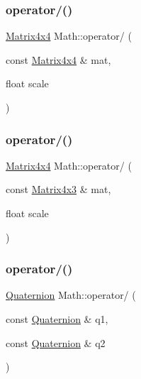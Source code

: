 \mbox{\label{namespace_math_a283dc37f79d3f2d51bb3e494f02a0ad3}} 
\subsubsection{\texorpdfstring{operator/()}{operator/()}\hspace{0.1cm}{\footnotesize\ttfamily [4/7]}}
{\footnotesize\ttfamily \mbox{\hyperlink{struct_math_1_1_matrix4x4}{Matrix4x4}} Math\+::operator/ (\begin{DoxyParamCaption}\item[{const \mbox{\hyperlink{struct_math_1_1_matrix4x4}{Matrix4x4}} \&}]{mat,  }\item[{float}]{scale }\end{DoxyParamCaption})}

\mbox{\label{namespace_math_a015e4eb983da8ccc218796edddd145ff}} 
\subsubsection{\texorpdfstring{operator/()}{operator/()}\hspace{0.1cm}{\footnotesize\ttfamily [5/7]}}
{\footnotesize\ttfamily \mbox{\hyperlink{struct_math_1_1_matrix4x4}{Matrix4x4}} Math\+::operator/ (\begin{DoxyParamCaption}\item[{const \mbox{\hyperlink{struct_math_1_1_matrix4x3}{Matrix4x3}} \&}]{mat,  }\item[{float}]{scale }\end{DoxyParamCaption})}

\mbox{\label{namespace_math_aad9dc0788e7f4ff5da49955014221905}} 
\subsubsection{\texorpdfstring{operator/()}{operator/()}\hspace{0.1cm}{\footnotesize\ttfamily [6/7]}}
{\footnotesize\ttfamily \mbox{\hyperlink{struct_math_1_1_quaternion}{Quaternion}} Math\+::operator/ (\begin{DoxyParamCaption}\item[{const \mbox{\hyperlink{struct_math_1_1_quaternion}{Quaternion}} \&}]{q1,  }\item[{const \mbox{\hyperlink{struct_math_1_1_quaternion}{Quaternion}} \&}]{q2 }\end{DoxyParamCaption})}

